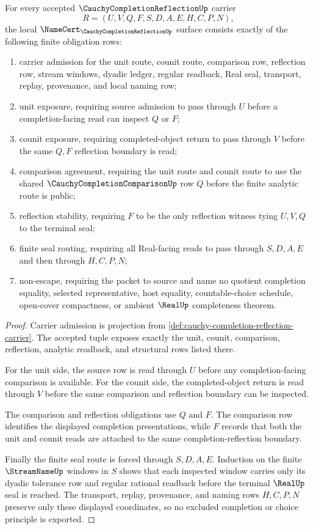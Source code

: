 \begin{theorem}
\label{thm:cauchy-completion-reflection-namecert-obligations}
For every accepted $\CauchyCompletionReflectionUp$ carrier
$$
R=(U,V,Q,F,S,D,A,E,H,C,P,N),
$$
the local $\NameCert_{\CauchyCompletionReflectionUp}$ surface consists exactly of the following finite obligation rows:
\begin{enumerate}
\item carrier admission for the unit route, counit route, comparison row, reflection row, stream windows, dyadic ledger, regular readback, Real seal, transport, replay, provenance, and local naming row;
\item unit exposure, requiring source admission to pass through $U$ before a completion-facing read can inspect $Q$ or $F$;
\item counit exposure, requiring completed-object return to pass through $V$ before the same $Q,F$ reflection boundary is read;
\item comparison agreement, requiring the unit route and counit route to use the shared $\CauchyCompletionComparisonUp$ row $Q$ before the finite analytic route is public;
\item reflection stability, requiring $F$ to be the only reflection witness tying $U,V,Q$ to the terminal seal;
\item finite seal routing, requiring all Real-facing reads to pass through $S,D,A,E$ and then through $H,C,P,N$;
\item non-escape, requiring the packet to source and name no quotient completion equality, selected representative, host equality, countable-choice schedule, open-cover compactness, or ambient $\RealUp$ completeness theorem.
\end{enumerate}
\end{theorem}
\begin{proof}
Carrier admission is projection from \autoref{def:cauchy-completion-reflection-carrier}. The accepted tuple exposes exactly the unit, counit, comparison, reflection, analytic readback, and structural rows listed there.

For the unit side, the source row is read through $U$ before any completion-facing comparison is available. For the counit side, the completed-object return is read through $V$ before the same comparison and reflection boundary can be inspected.

The comparison and reflection obligations use $Q$ and $F$. The comparison row identifies the displayed completion presentations, while $F$ records that both the unit and counit reads are attached to the same completion-reflection boundary.

Finally the finite seal route is forced through $S,D,A,E$. Induction on the finite $\StreamNameUp$ windows in $S$ shows that each inspected window carries only its dyadic tolerance row and regular rational readback before the terminal $\RealUp$ seal is reached. The transport, replay, provenance, and naming rows $H,C,P,N$ preserve only these displayed coordinates, so no excluded completion or choice principle is exported.
\end{proof}

